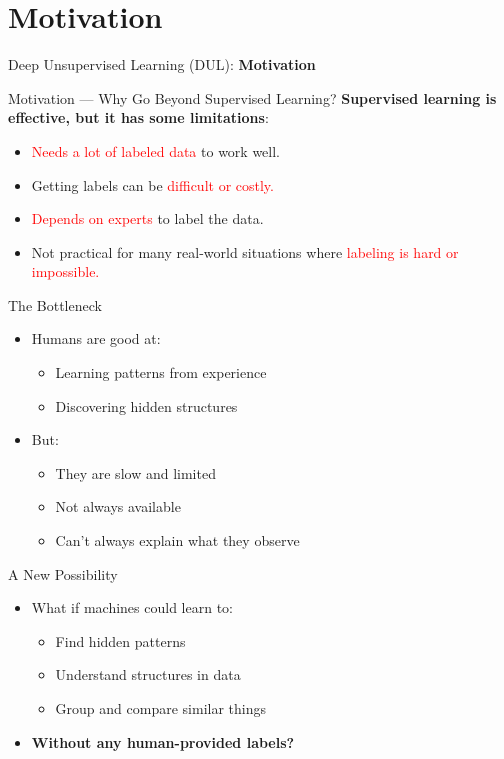 \section{Motivation}
\begin{frame}{}
    \LARGE Deep Unsupervised Learning (DUL): \textbf{Motivation}
\end{frame}

\begin{frame}{Motivation — Why Go Beyond Supervised Learning?}
    \textbf{Supervised learning is effective, but it has some limitations}:
    \begin{itemize}
        \item \textcolor{red}{Needs a lot of labeled data} to work well.
        \item Getting labels can be \textcolor{red}{difficult or costly.}
        \item \textcolor{red}{Depends on experts} to label the data.
        \item Not practical for many real-world situations where \textcolor{red}{labeling is hard or impossible.}
    \end{itemize}
\end{frame}
\begin{frame}{The Bottleneck}
    \begin{itemize}
        \item Humans are good at:
        \begin{itemize}
            \item Learning patterns from experience
            \item Discovering hidden structures
        \end{itemize}
        \item But:
        \begin{itemize}
            \item They are slow and limited
            \item Not always available
            \item Can't always explain what they observe
        \end{itemize}
    \end{itemize}
\end{frame}

\begin{frame}{A New Possibility}
    \begin{itemize}
        \setlength{\itemsep}{1cm}
        \item What if machines could learn to:
        \begin{itemize}
            \item Find hidden patterns
            \item Understand structures in data
            \item Group and compare similar things
        \end{itemize}
        \item[] {\Large \textbf{Without any human-provided labels?}}
    \end{itemize}
\end{frame}

